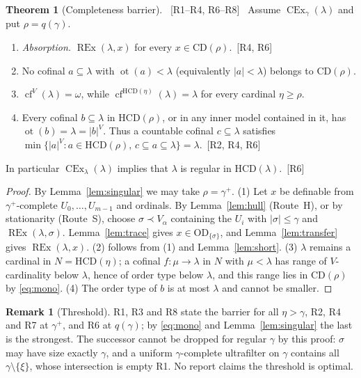 \documentclass[11pt,letterpaper]{article}
\theoremstyle{definition}
\newtheorem{theorem}[definition]{Theorem}
\newtheorem{remark}[definition]{Remark}
\numberwithin{equation}{section}
\newcommand{\OD}{\mathrm{OD}}
\newcommand{\CD}{\mathrm{CD}}
\newcommand{\HCD}{\mathrm{HCD}}
\newcommand{\CEx}{\operatorname{CEx}}
\newcommand{\REx}{\operatorname{REx}}
\newcommand{\cf}{\operatorname{cf}}
\newcommand{\ot}{\operatorname{ot}}
\newcommand{\src}[1]{\unskip\ {\normalfont\small\sffamily\color{Olive}[#1]}\ }
\newcommand{\R}[1]{\textsf{R#1}}
\begin{document}
\begin{theorem}[Completeness barrier]\label{thm:barrier}\src{R1--R4, R6--R8}
Assume $\CEx_\gamma(\lambda)$ and put $\rho=q(\gamma)$.
\begin{enumerate}
\item \emph{Absorption.} $\REx(\lambda,x)$ for every $x\in\CD(\rho)$.\src{R4, R6}
\item No cofinal $a\subseteq\lambda$ with $\ot(a)<\lambda$ (equivalently $|a|<\lambda$) belongs to $\CD(\rho)$.
\item $\cf^V(\lambda)=\omega$, while $\cf^{\HCD(\eta)}(\lambda)=\lambda$ for every cardinal $\eta\ge\rho$.
\item Every cofinal $b\subseteq\lambda$ in $\HCD(\rho)$, or in any inner model contained in it, has $\ot(b)=\lambda=|b|^V$. Thus a countable cofinal $c\subseteq\lambda$ satisfies $\min\{|a|^V:a\in\HCD(\rho),\,c\subseteq a\subseteq\lambda\}=\lambda$.\src{R2, R4, R6}
\end{enumerate}
In particular $\CEx_\lambda(\lambda)$ implies that $\lambda$ is regular in $\HCD(\lambda)$.\src{R6}
\end{theorem}

\begin{proof}
By Lemma~\ref{lem:singular} we may take $\rho=\gamma^+$. (1) Let $x$ be definable from $\gamma^+$-complete $U_0,\dots,U_{m-1}$ and ordinals. By Lemma~\ref{lem:hull} (Route~H), or by stationarity (Route~S), choose $\sigma\prec V_\alpha$ containing the $U_i$ with $|\sigma|\le\gamma$ and $\REx(\lambda,\sigma)$. Lemma~\ref{lem:trace} gives $x\in\OD_{\{\sigma\}}$, and Lemma~\ref{lem:transfer} gives $\REx(\lambda,x)$. (2) follows from (1) and Lemma~\ref{lem:short}. (3) $\lambda$ remains a cardinal in $N=\HCD(\eta)$; a cofinal $f:\mu\to\lambda$ in $N$ with $\mu<\lambda$ has range of $V$-cardinality below $\lambda$, hence of order type below $\lambda$, and this range lies in $\CD(\rho)$ by \eqref{eq:mono}. (4) The order type of $b$ is at most $\lambda$ and cannot be smaller.
\end{proof}

\begin{remark}[Threshold]
\R1, \R3 and \R8 state the barrier for all $\eta>\gamma$, \R2, \R4 and \R7 at $\gamma^+$, and \R6 at $q(\gamma)$; by \eqref{eq:mono} and Lemma~\ref{lem:singular} the last is the strongest. The successor cannot be dropped for regular $\gamma$ by this proof: $\sigma$ may have size exactly $\gamma$, and a uniform $\gamma$-complete ultrafilter on $\gamma$ contains all $\gamma\setminus\{\xi\}$, whose intersection is empty \R1. No report claims the threshold is optimal.
\end{remark}
\end{document}
